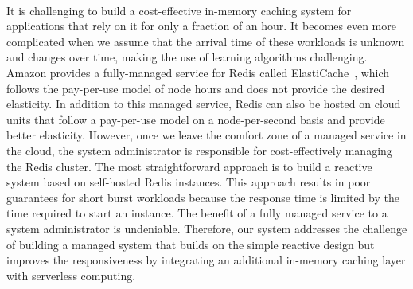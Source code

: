 
~\\
It is challenging to build a cost-effective in-memory caching system for applications that rely on it for only a fraction of an hour. It becomes even more complicated when we assume that the arrival time of these workloads is unknown and changes over time, making the use of learning algorithms challenging. Amazon provides a fully-managed service for Redis called ElastiCache~\cite{noauthor_amazon_nodate-1},  which follows the pay-per-use model of node hours and does not provide the desired elasticity. In addition to this managed service, Redis can also be hosted on cloud units that follow a pay-per-use model on a node-per-second basis and provide better elasticity. However, once we leave the comfort zone of a managed service in the cloud, the system administrator is responsible for cost-effectively managing the Redis cluster. The most straightforward approach is to build a reactive system based on self-hosted Redis instances. This approach results in poor guarantees for short burst workloads because the response time is limited by the time required to start an instance. The benefit of a fully managed service to a system administrator is undeniable. Therefore, our system addresses the challenge of building a managed system that builds on the simple reactive design but improves the responsiveness by integrating an additional in-memory caching layer with serverless computing.


